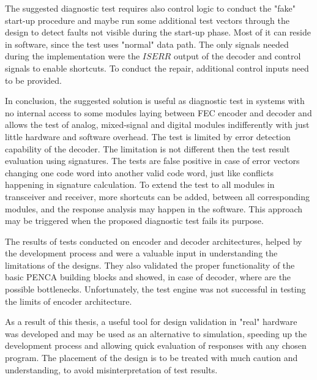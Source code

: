 The suggested diagnostic test requires also control logic to conduct the "fake" start-up procedure and maybe run some additional test vectors through the design to detect faults not visible during the start-up phase. Most of it can reside in software, since the test uses "normal" data path. The only signals needed during the implementation were the $ISERR$ output of the decoder and control signals to enable shortcuts. To conduct the repair, additional control inputs need to be provided.

In conclusion, the suggested solution is useful as diagnostic test in systems with no internal access to some modules laying between FEC encoder and decoder and allows the test of analog, mixed-signal and digital modules indifferently with just little hardware and software overhead. The test is limited by error detection capability of the decoder. The limitation is not different then the test result evaluation using signatures. The tests are false positive in case of error vectors changing one code word into another valid code word, just like conflicts happening in signature calculation. To extend the test to all modules in transceiver and receiver, more shortcuts can be added, between all corresponding modules, and the response analysis may happen in the software. This approach may be triggered when the proposed diagnostic test fails its purpose.

The results of tests conducted on encoder and decoder architectures, helped by the development process and were a valuable input in understanding the limitations of the designs. They also validated the proper functionality of the basic PENCA building blocks and showed, in case of decoder, where are the possible bottlenecks. Unfortunately, the test engine was not successful in testing the limits of encoder architecture.

As a result of this thesis, a useful tool for design validation in "real" hardware was developed and may be used as an alternative to simulation, speeding up the development process and allowing quick evaluation of responses with any chosen program. The placement of the design is to be treated with much caution and understanding, to avoid misinterpretation of test results. 